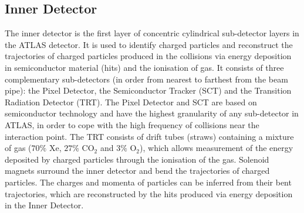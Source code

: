 

\subsection{Inner Detector}
The inner detector is the first layer of concentric cylindrical sub-detector layers in the ATLAS detector. It is used to identify charged particles and reconstruct the trajectories of charged particles produced in the collisions via energy deposition in semiconductor material (hits) and the ionisation of gas. It consists of three complementary sub-detectors (in order from nearest to farthest from the beam pipe): the Pixel Detector, the Semiconductor Tracker (SCT) and the Transition Radiation Detector (TRT). The Pixel Detector and SCT are based on semiconductor technology and have the highest granularity of any sub-detector in ATLAS, in order to cope with the high frequency of collisions near the interaction point. The TRT consists of drift tubes (straws) containing a mixture of gas ($70\%$ Xe, $27\%$ CO$_{2}$ and $3\%$ O$_{2}$), which allows measurement of the energy deposited by charged particles through the ionisation of the gas. Solenoid magnets surround the inner detector and bend the trajectories of charged particles. The charges and momenta of particles can be inferred from their bent trajectories, which are reconstructed by the hits produced via energy deposition in the Inner Detector.

